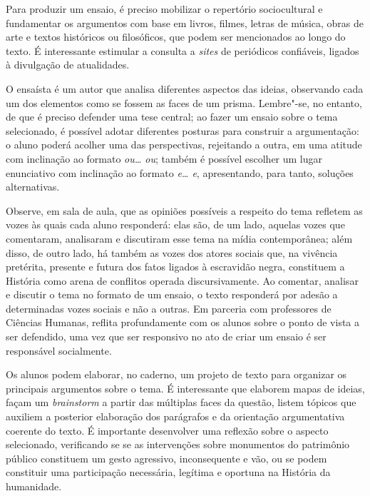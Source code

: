 \documentclass[12pt]{extarticle}
\begin{document}
Para produzir um ensaio, é preciso mobilizar o repertório sociocultural
e fundamentar os argumentos com base em livros, filmes, letras de
música, obras de arte e textos históricos ou filosóficos, que podem ser
mencionados ao longo do texto. É interessante estimular a consulta a
\emph{sites} de periódicos confiáveis, ligados à divulgação de
atualidades.

O ensaísta é um autor que analisa diferentes aspectos das ideias,
observando cada um dos elementos como se fossem as faces de um prisma.
Lembre"-se, no entanto, de que é preciso defender uma tese central; ao
fazer um ensaio sobre o tema selecionado, é possível adotar diferentes
posturas para construir a argumentação: o aluno poderá acolher uma das
perspectivas, rejeitando a outra, em uma atitude com inclinação ao
formato \emph{ou\ldots{} ou}; também é possível escolher um lugar enunciativo
com inclinação ao formato \emph{e\ldots{} e}, apresentando, para tanto,
soluções alternativas.

Observe, em sala de aula, que as opiniões possíveis a respeito do tema
refletem as vozes às quais cada aluno responderá: elas são, de um lado,
aquelas vozes que comentaram, analisaram e discutiram esse tema na mídia
contemporânea; além disso, de outro lado, há também as vozes dos atores
sociais que, na vivência pretérita, presente e futura dos fatos ligados
à escravidão negra, constituem a História como arena de conflitos
operada discursivamente. Ao comentar, analisar e discutir o tema no
formato de um ensaio, o texto responderá por adesão a determinadas vozes
sociais e não a outras. Em parceria com professores de Ciências Humanas,
reflita profundamente com os alunos sobre o ponto de vista a ser
defendido, uma vez que ser responsivo no ato de criar um ensaio é ser
responsável socialmente.

Os alunos podem elaborar, no caderno, um projeto de texto para organizar
os principais argumentos sobre o tema. É interessante que elaborem mapas
de ideias, façam um \emph{brainstorm} a partir das múltiplas faces da
questão, listem tópicos que auxiliem a posterior elaboração dos
parágrafos e da orientação argumentativa coerente do texto. É importante
desenvolver uma reflexão sobre o aspecto selecionado, verificando se se
as intervenções sobre monumentos do patrimônio público constituem um
gesto agressivo, inconsequente e vão, ou se podem constituir uma
participação necessária, legítima e oportuna na História da humanidade.
\end{document}

